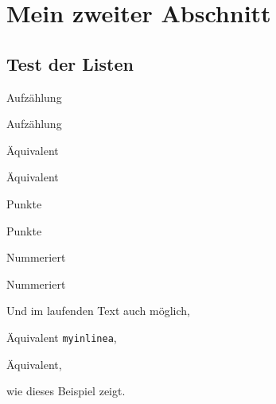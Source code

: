 
\thispagestyle{empty}
\section{Mein zweiter Abschnitt}\label{sec:zweiter-abschnitt}
\subsection{Test der Listen}\label{subsec:listen}
\begin{myenumerate}
\item
Aufzählung
\item
Aufzählung
\end{myenumerate}
\begin{myequivalent}
\item
Äquivalent
\item
Äquivalent
\end{myequivalent}
\begin{myitemize}
\item
Punkte
\item
Punkte
\end{myitemize}
\begin{mynumber}
\item
Nummeriert
\item
Nummeriert
\end{mynumber}
Und im laufenden Text auch möglich, 
\begin{myinlinea}
\item
Äquivalent \verb|myinlinea|, 
\item
Äquivalent, 
\end{myinlinea}
wie dieses Beispiel zeigt.
